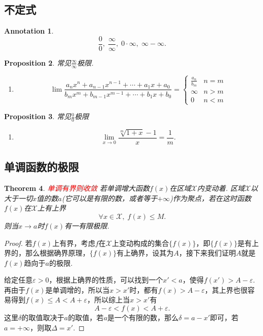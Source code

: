 \documentclass{article}
\newtheorem{theorem}{Theorem}[section]
\newtheorem{proposition}[theorem]{Proposition}
\newtheorem{annotation}[theorem]{Annotation}
\newcommand{\redt}[1]{\textcolor{red}{#1}}
\begin{document}
\subsection{不定式}

\begin{annotation}
$$
\frac{0}{0},\; \frac{\infty}{\infty},\; 0\cdot \infty,\; \infty-\infty.
$$
\end{annotation}

\begin{proposition}
\rm {\color{red}常见$\frac{\infty}{\infty}$极限}.
\begin{enumerate}
	\item
	$$
		\lim \frac{a_nx^{n} + a_{n-1}x^{n-1} + \cdots + a_1x + a_0}{b_mx^{m} + b_{m-1}x^{m-1} + \cdots + b_1x + b_0} = \left\{ \begin{array}{ll}
		\frac{a_n}{b_m} & n=m \\
		\infty & n > m \\
		0 & n < m 
\end{array} \right.
	$$
\end{enumerate}
\end{proposition}

\begin{proposition}
\rm {\color{red}常见$\frac{0}{0}$极限}
\begin{enumerate}
	\item 
	$$
	\lim\limits_{x \rightarrow 0} \frac{\sqrt[m]{1+x}-1}{x} = \frac{1}{m}.
	$$
\end{enumerate}
\end{proposition}

\subsection{单调函数的极限}

\begin{theorem}
\rm \redt{单调有界则收敛} 若单调增大函数$f(x)$在区域$\mathcal{X}$内变动着. 区域$\mathcal{X}$以大于一切$x$值的数$a$(它可以是有限的数，或者等于$+\infty$)作为聚点，若在这时函数$f(x)$在$\mathcal{X}$上有上界
$$
\forall x \in \mathcal{X},\;f(x) \leq M.
$$
则当$x \rightarrow a$时$f(x)$有一有限极限. 
\end{theorem}

\begin{proof}
若$f(x)$上有界，考虑$f$在$\mathcal{X}$上变动构成的集合$\{f(x)\}$，即$\{f(x)\}$是有上界的，那么根据确界原理，$\{f(x)\}$有上确界，设其为$A$，接下来我们证明$A$就是$f(x)$趋向于$a$的极限.

给定任意$\varepsilon > 0$，根据上确界的性质，可以找到一个$x' < a$，使得$f(x') > A-\varepsilon$. 再由于$f(x)$是单调增的，所以当$x > x'$时，都有$f(x) > A -\varepsilon$，其上界也很容易得到$f(x) \leq A < A+\varepsilon$，所以综上当$x > x'$有
$$
A-\varepsilon < f(x) < A+\varepsilon.
$$
这里$\delta$的取值取决于$a$的取值，若$a$是一个有限的数，那么$\delta = a-x'$即可，若$a = +\infty$，则取$\Delta = x'$. 
\end{proof}
\end{document}
